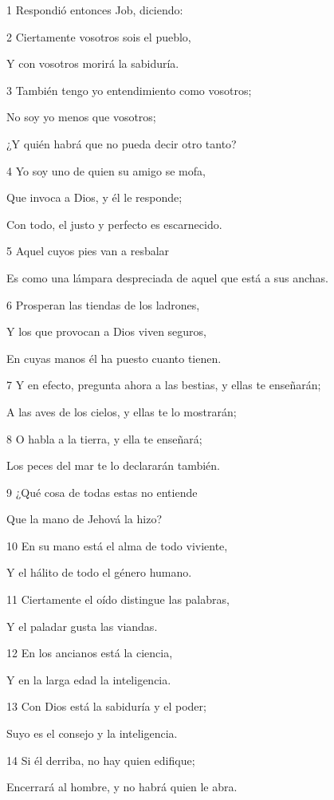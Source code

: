 \par 1 Respondió entonces Job, diciendo:
\par 2 Ciertamente vosotros sois el pueblo,
\par Y con vosotros morirá la sabiduría.
\par 3 También tengo yo entendimiento como vosotros;
\par No soy yo menos que vosotros;
\par ¿Y quién habrá que no pueda decir otro tanto? 
\par 4 Yo soy uno de quien su amigo se mofa,
\par Que invoca a Dios, y él le responde;
\par Con todo, el justo y perfecto es escarnecido.
\par 5 Aquel cuyos pies van a resbalar
\par Es como una lámpara despreciada de aquel que está a sus anchas.
\par 6 Prosperan las tiendas de los ladrones,
\par Y los que provocan a Dios viven seguros,
\par En cuyas manos él ha puesto cuanto tienen.
\par 7 Y en efecto, pregunta ahora a las bestias, y ellas te enseñarán;
\par A las aves de los cielos, y ellas te lo mostrarán;
\par 8 O habla a la tierra, y ella te enseñará;
\par Los peces del mar te lo declararán también.
\par 9 ¿Qué cosa de todas estas no entiende
\par Que la mano de Jehová la hizo?
\par 10 En su mano está el alma de todo viviente,
\par Y el hálito de todo el género humano.
\par 11 Ciertamente el oído distingue las palabras,
\par Y el paladar gusta las viandas.
\par 12 En los ancianos está la ciencia,
\par Y en la larga edad la inteligencia.
\par 13 Con Dios está la sabiduría y el poder;
\par Suyo es el consejo y la inteligencia.
\par 14 Si él derriba, no hay quien edifique;
\par Encerrará al hombre, y no habrá quien le abra.
